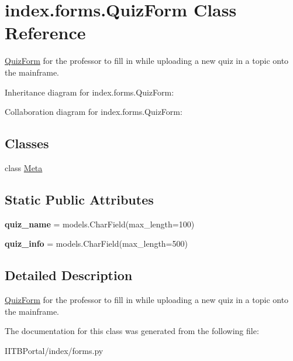 \hypertarget{classindex_1_1forms_1_1QuizForm}{}\section{index.\+forms.\+Quiz\+Form Class Reference}
\label{classindex_1_1forms_1_1QuizForm}


\hyperlink{classindex_1_1forms_1_1QuizForm}{Quiz\+Form} for the professor to fill in while uploading a new quiz in a topic onto the mainframe.  




Inheritance diagram for index.\+forms.\+Quiz\+Form\+:


Collaboration diagram for index.\+forms.\+Quiz\+Form\+:
\subsection*{Classes}
\begin{DoxyCompactItemize}
\item 
class \hyperlink{classindex_1_1forms_1_1QuizForm_1_1Meta}{Meta}
\end{DoxyCompactItemize}
\subsection*{Static Public Attributes}
\begin{DoxyCompactItemize}
\item 
\mbox{\label{classindex_1_1forms_1_1QuizForm_a038feb1f3c43a5fb4c6e89fca41eabf6}} 
{\bfseries quiz\+\_\+name} = models.\+Char\+Field(max\+\_\+length=100)
\item 
\mbox{\label{classindex_1_1forms_1_1QuizForm_a45d0c139fcbf2175b4fddce1d2effbea}} 
{\bfseries quiz\+\_\+info} = models.\+Char\+Field(max\+\_\+length=500)
\end{DoxyCompactItemize}


\subsection{Detailed Description}
\hyperlink{classindex_1_1forms_1_1QuizForm}{Quiz\+Form} for the professor to fill in while uploading a new quiz in a topic onto the mainframe. 



The documentation for this class was generated from the following file\+:\begin{DoxyCompactItemize}
\item 
I\+I\+T\+B\+Portal/index/forms.\+py\end{DoxyCompactItemize}
